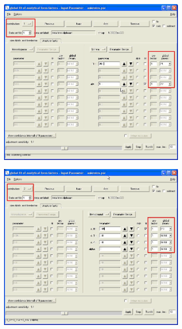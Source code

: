 \begin{figure}[htb]
\centering
\begin{subfigure}[b]{.48\textwidth}
   \centering
   \includegraphics[width=\textwidth]{QTmultiplefitUI1.png}
   \label{fig:QTmultiplefitUI1}
\end{subfigure}
\hfill
\begin{subfigure}[b]{.48\textwidth}
   \centering
  \includegraphics[width=\textwidth]{QTmultiplefitUI2.png}

\end{subfigure}
\end{figure}

